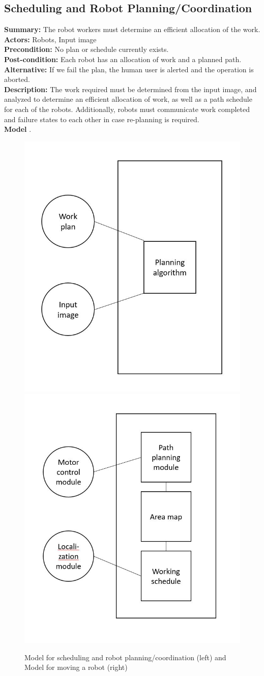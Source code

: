 \subsection{Scheduling and Robot Planning/Coordination}
\textbf{Summary:} The robot workers must determine an efficient allocation of the work. \\
\textbf{Actors:} Robots, Input image \\
\textbf{Precondition:} No plan or schedule currently exists. \\
\textbf{Post-condition:} Each robot has an allocation of work and a planned path. \\
\textbf{Alternative:} If we fail the plan, the human user is alerted and the operation is aborted. \\
\textbf{Description:} The work required must be determined from the input image, and analyzed to determine an efficient allocation of work, as well as a path schedule for each of the robots. Additionally, robots must communicate work completed and failure states to each other in case re-planning is required. \\
\textbf{Model} .\\

\begin{figure}
 \centering
  \includegraphics[width=0.48\columnwidth]{figs/use_case-planning_coordination.jpg}
	\includegraphics[width=0.48\columnwidth]{figs/use_case-moving.jpg}
	\caption{Model for scheduling and robot planning/coordination (left) and Model for moving a robot (right)}
 \label{fig:scheduling_moving}
\end{figure}


